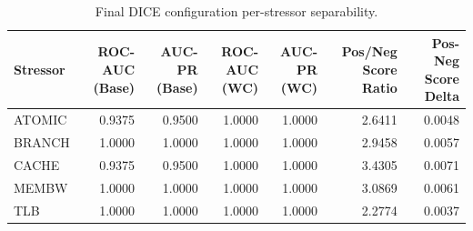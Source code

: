 \begin{table}[t]
\centering
\caption{Final DICE configuration per-stressor separability.}
\label{tab:dice_full_stressor}
\footnotesize
\begin{tabular}{lrrrrrr}
\toprule
Stressor & ROC-AUC (Base) & AUC-PR (Base) & ROC-AUC (WC) & AUC-PR (WC) & Pos/Neg Score Ratio & Pos-Neg Score Delta \\
\midrule
ATOMIC & 0.9375 & 0.9500 & 1.0000 & 1.0000 & 2.6411 & 0.0048 \\
BRANCH & 1.0000 & 1.0000 & 1.0000 & 1.0000 & 2.9458 & 0.0057 \\
CACHE & 0.9375 & 0.9500 & 1.0000 & 1.0000 & 3.4305 & 0.0071 \\
MEMBW & 1.0000 & 1.0000 & 1.0000 & 1.0000 & 3.0869 & 0.0061 \\
TLB & 1.0000 & 1.0000 & 1.0000 & 1.0000 & 2.2774 & 0.0037 \\
\bottomrule
\end{tabular}

\end{table}
